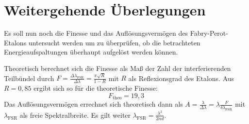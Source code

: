 \section{Weitergehende Überlegungen}

Es soll nun noch die Finesse und das Auflösungsvermögen des Fabry-Perot-Etalons untersucht werden um zu überprüfen, ob die betrachteten Energieaufspaltungen überhaupt aufgelöst werden können.

Theoretisch berechnet sich die Finesse als Maß der Zahl der interferierenden Teilbündel durch $F=\frac{\Delta \lambda_{\text{FSR}}}{\Delta \lambda}=\frac{\pi \sqrt{R}}{1-R}$ mit $R$ als Reflexionsgrad des Etalons. Aus $R=0,85$ ergibt sich so für die theoretische Finesse:
\[F_{\text{theo}}=19,3\]
Das Auflösungsvermögen errechnet sich theoretisch dann als $A=\frac{\lambda}{\Delta \lambda}=\lambda \frac{F}{\delta \lambda_{\text{FSR}}}$ mit $\lambda_{\text{FSR}}$ als freie Spektralbreite. Es gilt weiter $\lambda_{\text{FSR}}=\frac{\lambda^2}{2nd}$.
